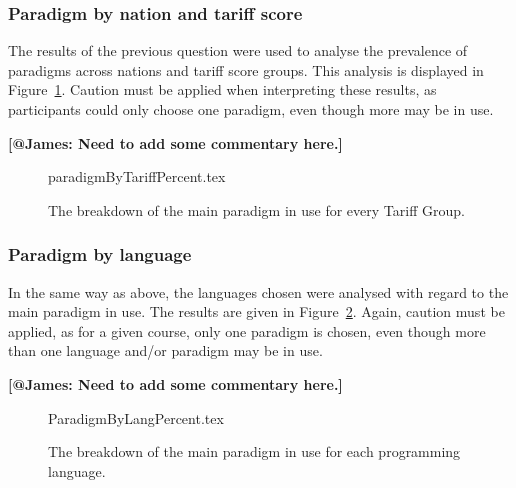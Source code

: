 \documentclass{sig-alternate}
\begin{document}
\subsubsection{Paradigm by nation and tariff score}
The results of the previous question were used to analyse the prevalence of paradigms across nations and tariff score groups. This analysis is displayed in Figure~\ref{fig:paradigmTariff}. Caution must be applied when interpreting these results, as participants could only choose one paradigm, even though more may be in use.

{\bf{[@James: Need to add some commentary here.]}}

\begin{figure}[ht]\vskip-12pt
\begin{center}
{paradigmByTariffPercent.tex}
\end{center}\vskip-18pt
\caption{The breakdown of the main paradigm in use for every Tariff Group.\label{fig:paradigmTariff}}
\end{figure}

\subsubsection{Paradigm by language}

In the same way as above, the languages chosen were analysed with regard to the main paradigm in use. The results are given in Figure~\ref{fig:paradigmLang}. Again, caution must be applied, as for a given course, only one paradigm is chosen, even though more than one language and/or paradigm may be in use.

{\bf{[@James: Need to add some commentary here.]}}
\begin{figure}
\begin{center}
{ParadigmByLangPercent.tex}
\end{center}\vskip-18pt
\caption{The breakdown of the main paradigm in use for each programming language.\label{fig:paradigmLang}}
\end{figure}


%
\end{document}
